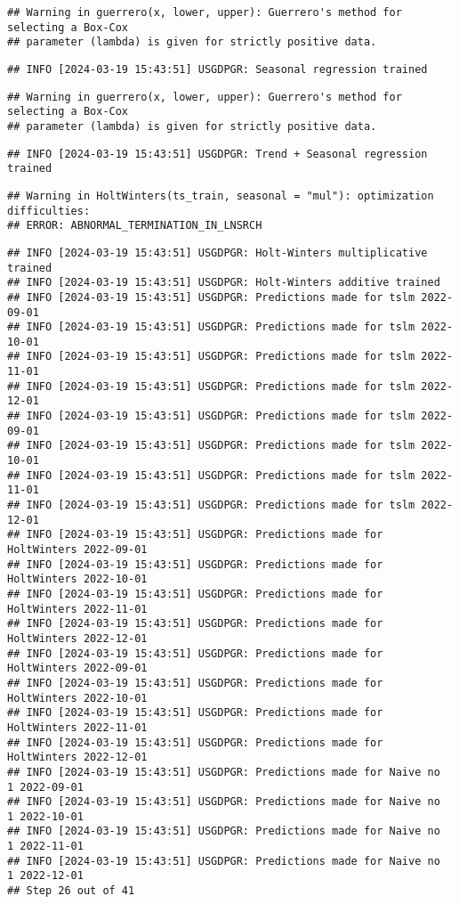 \documentclass[
]{article}
\begin{document}
\begin{verbatim}
## Warning in guerrero(x, lower, upper): Guerrero's method for selecting a Box-Cox
## parameter (lambda) is given for strictly positive data.
\end{verbatim}

\begin{verbatim}
## INFO [2024-03-19 15:43:51] USGDPGR: Seasonal regression trained
\end{verbatim}

\begin{verbatim}
## Warning in guerrero(x, lower, upper): Guerrero's method for selecting a Box-Cox
## parameter (lambda) is given for strictly positive data.
\end{verbatim}

\begin{verbatim}
## INFO [2024-03-19 15:43:51] USGDPGR: Trend + Seasonal regression trained
\end{verbatim}

\begin{verbatim}
## Warning in HoltWinters(ts_train, seasonal = "mul"): optimization difficulties:
## ERROR: ABNORMAL_TERMINATION_IN_LNSRCH
\end{verbatim}

\begin{verbatim}
## INFO [2024-03-19 15:43:51] USGDPGR: Holt-Winters multiplicative trained
## INFO [2024-03-19 15:43:51] USGDPGR: Holt-Winters additive trained
## INFO [2024-03-19 15:43:51] USGDPGR: Predictions made for tslm 2022-09-01
## INFO [2024-03-19 15:43:51] USGDPGR: Predictions made for tslm 2022-10-01
## INFO [2024-03-19 15:43:51] USGDPGR: Predictions made for tslm 2022-11-01
## INFO [2024-03-19 15:43:51] USGDPGR: Predictions made for tslm 2022-12-01
## INFO [2024-03-19 15:43:51] USGDPGR: Predictions made for tslm 2022-09-01
## INFO [2024-03-19 15:43:51] USGDPGR: Predictions made for tslm 2022-10-01
## INFO [2024-03-19 15:43:51] USGDPGR: Predictions made for tslm 2022-11-01
## INFO [2024-03-19 15:43:51] USGDPGR: Predictions made for tslm 2022-12-01
## INFO [2024-03-19 15:43:51] USGDPGR: Predictions made for HoltWinters 2022-09-01
## INFO [2024-03-19 15:43:51] USGDPGR: Predictions made for HoltWinters 2022-10-01
## INFO [2024-03-19 15:43:51] USGDPGR: Predictions made for HoltWinters 2022-11-01
## INFO [2024-03-19 15:43:51] USGDPGR: Predictions made for HoltWinters 2022-12-01
## INFO [2024-03-19 15:43:51] USGDPGR: Predictions made for HoltWinters 2022-09-01
## INFO [2024-03-19 15:43:51] USGDPGR: Predictions made for HoltWinters 2022-10-01
## INFO [2024-03-19 15:43:51] USGDPGR: Predictions made for HoltWinters 2022-11-01
## INFO [2024-03-19 15:43:51] USGDPGR: Predictions made for HoltWinters 2022-12-01
## INFO [2024-03-19 15:43:51] USGDPGR: Predictions made for Naive no  1 2022-09-01
## INFO [2024-03-19 15:43:51] USGDPGR: Predictions made for Naive no  1 2022-10-01
## INFO [2024-03-19 15:43:51] USGDPGR: Predictions made for Naive no  1 2022-11-01
## INFO [2024-03-19 15:43:51] USGDPGR: Predictions made for Naive no  1 2022-12-01
## Step 26 out of 41
\end{verbatim}
\end{document}
